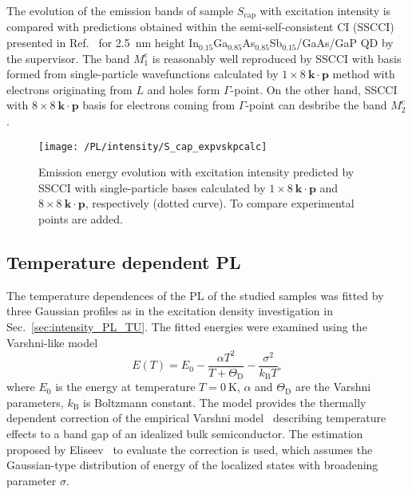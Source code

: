 The evolution of the emission bands of sample $S_\mathrm{cap}$ with excitation intensity is compared with predictions obtained within the semi-self-consistent CI (SSCCI) presented in Ref.~\citep{Klenovsky2017} %
for 2.5~nm height In$_{0.15}$Ga$_{0.85}$As$_{0.85}$Sb$_{0.15}$/GaAs/GaP QD by the supervisor. The band $M_1^\mathrm{c}$ is reasonably well reproduced by SSCCI with basis formed from single-particle wavefunctions calculated by $1\times8~\mathbf{k \cdot p}$ method with electrons originating from $L$ and holes form $\Gamma$-point. On the other hand, SSCCI with $8\times8~\mathbf{k \cdot p}$ basis for electrons coming from $\Gamma$-point can desbribe the band $M_2^\mathrm{c}$.
\begin{figure}
	\centering
	\texttt{[image: /PL/intensity/S\_cap\_expvskpcalc]}
	\caption{Emission energy evolution with excitation intensity predicted by SSCCI with single-particle bases calculated by $1\times8~\mathbf{k \cdot p}$ and $8\times8~\mathbf{k \cdot p}$, respectively (dotted curve). To compare experimental points are added.}
	\label{fig:QD_cap_int_expvstheory}
\end{figure}

\newpage
\subsection{Temperature dependent PL}
\label{Sec:temp_PL_TU}
The temperature dependences of the PL of the studied samples was fitted by three Gaussian profiles as in the excitation density investigation in Sec.~\ref{sec:intensity_PL_TU}. The fitted energies were examined using the Varshni-like model
%
\begin{equation}
E(T)=E_0-\frac{\alpha T^2}{T+\Theta_\mathrm{D}}-\frac{\sigma^2}{k_\mathrm{B}T}, \label{eq:Varshni-like}
\end{equation}
where $E_0$ is the energy at temperature $T=0~\mathrm{K}$, $\alpha$ and $\Theta_\mathrm{D}$ are the Varshni parameters, $k_\mathrm{B}$ is Boltzmann constant. The model provides the thermally dependent correction of the empirical Varshni model~\citep{Varshni} describing temperature effects to a band gap of an idealized bulk semiconductor. The estimation proposed by Eliseev~\citep{Eliseev_apl2003_PLtemp} to evaluate the correction is used, which assumes the Gaussian-type distribution of energy of the localized states with broadening parameter $\sigma$.

